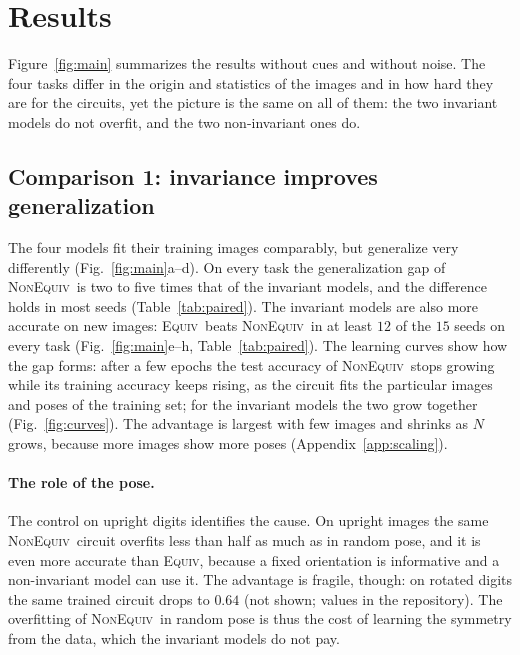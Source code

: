 \documentclass[aps,pra,reprint,superscriptaddress,longbibliography]{revtex4-2}
\newcommand{\Equiv}{\textsc{Equiv}}
\newcommand{\NonEquiv}{\textsc{NonEquiv}}
\begin{document}
\section{Results}\label{sec:results}


Figure~\ref{fig:main} summarizes the results without cues and without noise. The four tasks differ in the origin and statistics of the images and in how hard they are for the circuits, yet the picture is the same on all of them: the two invariant models do not overfit, and the two non-invariant ones do.

\subsection{Comparison 1: invariance improves generalization}\label{subsec:results_c1}

The four models fit their training images comparably, but generalize very differently (Fig.~\ref{fig:main}a--d). On every task the generalization gap of \NonEquiv\ is two to five times that of the invariant models, and the difference holds in most seeds (Table~\ref{tab:paired}). The invariant models are also more accurate on new images: \Equiv\ beats \NonEquiv\ in at least $12$ of the $15$ seeds on every task (Fig.~\ref{fig:main}e--h, Table~\ref{tab:paired}). The learning curves show how the gap forms: after a few epochs the test accuracy of \NonEquiv\ stops growing while its training accuracy keeps rising, as the circuit fits the particular images and poses of the training set; for the invariant models the two grow together (Fig.~\ref{fig:curves}). The advantage is largest with few images and shrinks as $N$ grows, because more images show more poses (Appendix~\ref{app:scaling}).

\paragraph{The role of the pose.} The control on upright digits identifies the cause. On upright images the same \NonEquiv\ circuit overfits less than half as much as in random pose, and it is even more accurate than \Equiv, because a fixed orientation is informative and a non-invariant model can use it. The advantage is fragile, though: on rotated digits the same trained circuit drops to $0.64$ (not shown; values in the repository). The overfitting of \NonEquiv\ in random pose is thus the cost of learning the symmetry from the data, which the invariant models do not pay.
\end{document}
